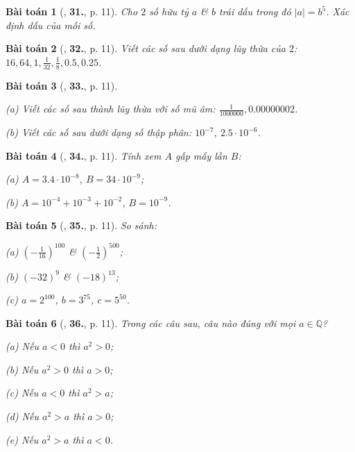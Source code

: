 \documentclass{article}
\numberwithin{equation}{section}
\newtheorem{baitoan}{Bài toán}[section]
\begin{document}
\begin{baitoan}[\cite{Binh_Toan_7_tap_1}, \textbf{31.}, p. 11]
	Cho $2$ số hữu tỷ $a$ \& $b$ trái dấu trong đó $|a| = b^5$. Xác định dấu của mỗi số.
\end{baitoan}

\begin{baitoan}[\cite{Binh_Toan_7_tap_1}, \textbf{32.}, p. 11]
	Viết các số sau dưới dạng lũy thừa của $2$: $16,64,1,\frac{1}{32},\frac{1}{8},0.5,0.25$.
\end{baitoan}

\begin{baitoan}[\cite{Binh_Toan_7_tap_1}, \textbf{33.}, p. 11]
	\begin{enumerate*}
		\item[(a)] Viết các số sau thành lũy thừa với số mũ âm: $\frac{1}{1000000},0.00000002$.
		\item[(b)] Viết các số sau dưới dạng số thập phân: $10^{-7}$, $2.5\cdot 10^{-6}$.
	\end{enumerate*}
\end{baitoan}

\begin{baitoan}[\cite{Binh_Toan_7_tap_1}, \textbf{34.}, p. 11]
	Tính xem $A$ gấp mấy lần $B$:
	\begin{enumerate*}
		\item[(a)] $A = 3.4\cdot 10^{-8}$, $B = 34\cdot 10^{-9}$;
		\item[(b)] $A = 10^{-4} + 10^{-3} + 10^{-2}$, $B = 10^{-9}$.
	\end{enumerate*}
\end{baitoan}

\begin{baitoan}[\cite{Binh_Toan_7_tap_1}, \textbf{35.}, p. 11]
	So sánh:
	\begin{enumerate*}
		\item[(a)] $\left(-\frac{1}{16}\right)^{100}$ \& $\left(-\frac{1}{2}\right)^{500}$;
		\item[(b)] $(-32)^9$ \& $(-18)^{13}$;
		\item[(c)] $a = 2^{100}$, $b = 3^{75}$, $c = 5^{50}$.
	\end{enumerate*}
\end{baitoan}

\begin{baitoan}[\cite{Binh_Toan_7_tap_1}, \textbf{36.}, p. 11]
	Trong các câu sau, câu nào đúng với mọi $a\in\mathbb{Q}$?
	\begin{enumerate*}
		\item[(a)] Nếu $a < 0$ thì $a^2 > 0$;
		\item[(b)] Nếu $a^2 > 0$ thì $a > 0$;
		\item[(c)] Nếu $a < 0$ thì $a^2 > a$;
		\item[(d)] Nếu $a^2 > a$ thì $a > 0$;
		\item[(e)] Nếu $a^2 > a$ thì $a < 0$.
	\end{enumerate*}
\end{baitoan}
\end{document}
